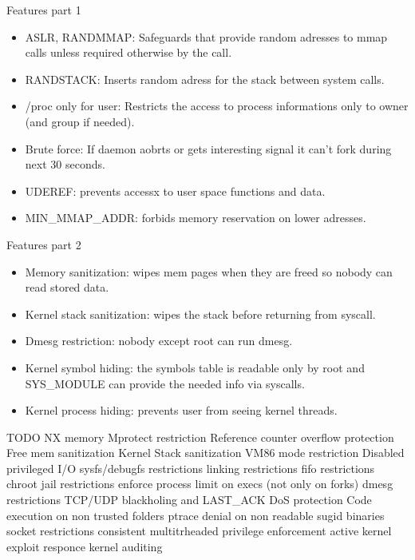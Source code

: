 \documentclass{beamer}
\begin{document}
\begin{frame}{Features part 1}
	\begin{itemize}
	\item ASLR, RANDMMAP: Safeguards that provide random adresses to mmap calls unless required otherwise by the call.
	\item RANDSTACK: Inserts random adress for the stack between system calls.
	\item /proc only for user: Restricts the access to process informations only to owner (and group if needed).
	\item Brute force: If daemon aobrts or gets interesting signal it can't fork during next 30 seconds.
	\item UDEREF: prevents accessx to user space functions and data.
	\item MIN\_MMAP\_ADDR: forbids memory reservation on lower adresses.
	\end{itemize}
\end{frame}

\begin{frame}{Features part 2}
	\begin{itemize}
	\item Memory sanitization: wipes mem pages when they are freed so nobody can read stored data.
	\item Kernel stack sanitization: wipes the stack before returning from syscall.
	\item Dmesg restriction: nobody except root can run dmesg.
	\item Kernel symbol hiding: the symbols table is readable only by root and SYS\_MODULE can provide the needed info via syscalls.
	\item Kernel process hiding: prevents user from seeing kernel threads.
	\end{itemize}
\end{frame}

\begin{frame}{TODO}
NX memory
Mprotect restriction
Reference counter overflow protection
Free mem sanitization
Kernel Stack sanitization
VM86 mode restriction
Disabled privileged I/O
sysfs/debugfs restrictions
linking restrictions
fifo restrictions
chroot jail restrictions
enforce process limit on execs (not only on forks)
dmesg restrictions
TCP/UDP blackholing and LAST\_ACK DoS protection
Code execution on non trusted folders
ptrace denial on non readable sugid binaries
socket restrictions
consistent multitrheaded privilege enforcement
active kernel exploit responce
kernel auditing
\end{frame}
\end{document}

